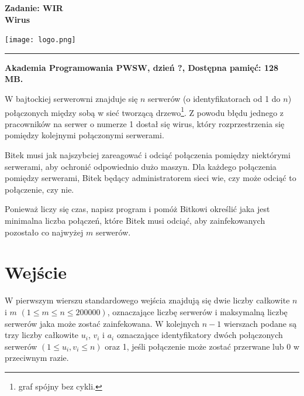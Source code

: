 \documentclass[10pt]{article}
\begin{document}
    

    \noindent
    \begin{minipage}{0.5\textwidth}
        \LARGE{\textsf{\textbf{Zadanie: WIR\\Wirus}}}
    \end{minipage}
    \begin{minipage}{0.5\textwidth}
        \begin{flushright}
            \texttt{[image: logo.png]}
        \end{flushright}
    \end{minipage}
    
    \noindent\rule{\textwidth}{0.4pt}
    
    \noindent\textbf{Akademia Programowania PWSW, dzień ?, Dostępna pamięć: 128 MB.}
    \vspace{1em}
    
    
    \noindent
    W bajtockiej serwerowni znajduje się $n$ serwerów (o identyfikatorach od 1 do $n$) połączonych między sobą w sieć tworzącą drzewo\footnote{graf spójny bez cykli.}. Z powodu błędu jednego z pracowników na serwer o numerze 1 dostał się wirus, który rozprzestrzenia się pomiędzy kolejnymi połączonymi serwerami. 

    Bitek musi jak najszybciej zareagować i odciąć połączenia pomiędzy niektórymi serwerami, aby ochronić odpowiednio dużo maszyn. Dla każdego połączenia pomiędzy serwerami, Bitek będący administratorem sieci wie, czy może odciąć to połączenie, czy nie. 
    
    Ponieważ liczy się czas, napisz program i pomóż Bitkowi określić jaka jest minimalna liczba połączeń, które Bitek musi odciąć, aby zainfekowanych pozostało co najwyżej $m$ serwerów.


    \section*{Wejście}
    
    W pierwszym wierszu standardowego wejścia znajdują się dwie liczby całkowite $n$ i $m$ $(1\leq m\leq n\leq 200000)$, oznaczające liczbę serwerów i maksymalną liczbę serwerów jaka może zostać zainfekowana. W kolejnych $n-1$ wierszach podane są trzy liczby całkowite $u_{i}$, $v_{i}$ i $a_{i}$ oznaczające identyfikatory dwóch połączonych serwerów $(1 \leq u_{i}, v_{i} \leq n)$ oraz 1, jeśli połączenie może zostać przerwane lub 0 w przeciwnym razie.
\end{document}
